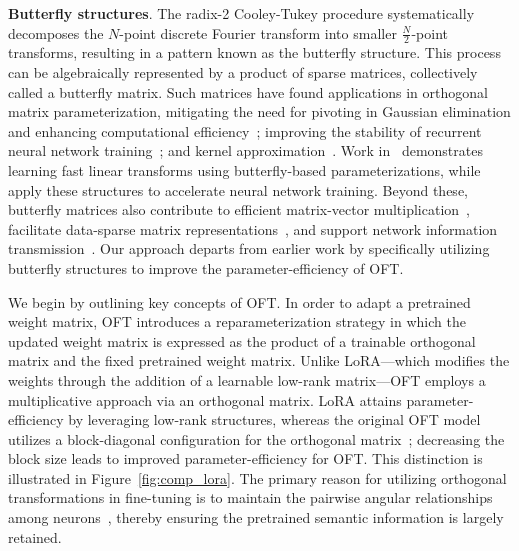 \textbf{Butterfly structures}. The radix-2 Cooley-Tukey procedure systematically decomposes the $N$-point discrete Fourier transform into smaller $\frac{N}{2}$-point transforms, resulting in a pattern known as the butterfly structure. This process can be algebraically represented by a product of sparse matrices, collectively called a butterfly matrix. Such matrices have found applications in orthogonal matrix parameterization, mitigating the need for pivoting in Gaussian elimination and enhancing computational efficiency~\cite{parker1995random}; improving the stability of recurrent neural network training~\cite{jing2017tunable}; and kernel approximation~\cite{munkhoeva2018quadrature}. Work in~\cite{dao2019learning,dao2019kaleidoscope} demonstrates learning fast linear transforms using butterfly-based parameterizations, while~\cite{chen2022pixelated,dao2022monarch} apply these structures to accelerate neural network training. Beyond these, butterfly matrices also contribute to efficient matrix-vector multiplication~\cite{michielssen1996multilevel,o2010algorithm}, facilitate data-sparse matrix representations~\cite{li2015butterfly}, and support network information transmission~\cite{klasing1994broadcasting,li2003linear,rajasingh2016transmission}. Our approach departs from earlier work by specifically utilizing butterfly structures to improve the parameter-efficiency of OFT.

We begin by outlining key concepts of OFT. In order to adapt a pretrained weight matrix, OFT introduces a reparameterization strategy in which the updated weight matrix is expressed as the product of a trainable orthogonal matrix and the fixed pretrained weight matrix. Unlike LoRA—which modifies the weights through the addition of a learnable low-rank matrix—OFT employs a multiplicative approach via an orthogonal matrix. LoRA attains parameter-efficiency by leveraging low-rank structures, whereas the original OFT model utilizes a block-diagonal configuration for the orthogonal matrix~\cite{qiu2023controlling}; decreasing the block size leads to improved parameter-efficiency for OFT. This distinction is illustrated in Figure~\ref{fig:comp_lora}. The primary reason for utilizing orthogonal transformations in fine-tuning is to maintain the pairwise angular relationships among neurons~\cite{liu2018learning,liu2021orthogonal,qiu2023controlling}, thereby ensuring the pretrained semantic information is largely retained. 

